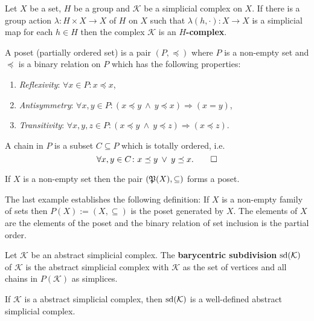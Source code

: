 \begin{defin}
    Let $X$ be a set, $H$ be a group and $\mathcal{K}$ be a simplicial complex on $X$. If there is a group action $\lambda \colon H \times X \to X$ of $H$ on $X$ such that $\lambda(h, \cdot)\colon X\to X$ is a simplicial map for each $h \in H$ then the complex $\mathcal{K}$ is an \textbf{$H$-complex}.
\end{defin}

\begin{defin}
    A poset (partially ordered set) is a pair $(P, \preceq)$ where 
    $P$ is a non-empty set and 
    $\preceq$ is a binary relation on $P$ which has the following properties:
    \begin{enumerate}
        \item \textit{Reflexivity}: $\forall x \in P\colon x \preceq x$,
        \item \textit{Antisymmetry}: $\forall x, y \in P\colon (x \preceq y \: \land \: y \preceq x) \Rightarrow (x = y)$,
        \item \textit{Transitivity}: $\forall x, y, z \in P\colon (x \preceq y \: \land \: y \preceq z) \Rightarrow (x \preceq z)$.
    \end{enumerate}
    A chain in $P$ is a subset $C \subseteq P$ which is totally ordered, i.e.
    \begin{equation*}
        \forall x, y \in C\colon x \preceq y \: \lor \: y \preceq x. \qedhere
    \end{equation*}
\end{defin}

\begin{ex}
    If $X$ is a non-empty set then the pair $(\mathfrak{P}(X), \subseteq)$ forms a poset.
\end{ex}

The last example establishes the following definition:
If $X$ is a non-empty family of sets then $P(X) := (X, \subseteq)$ is the poset generated by $X$. The elements of $X$
are the elements of the poset and the binary relation of set inclusion is the partial order.

\begin{defin}
    Let $\mathcal{K}$ be an abstract simplicial complex. The \textbf{barycentric subdivision} ${\rm sd}(\mathcal{K})$ of $\mathcal{K}$
    is the abstract simplicial complex with $\mathcal{K}$ as the set of vertices and all chains in $P(\mathcal{K})$ as simplices.
\end{defin}

\begin{thm}
    If $\mathcal{K}$ is a abstract simplicial complex, then ${\rm sd}(\mathcal{K})$ is a well-defined abstract simplicial complex.
\end{thm}

